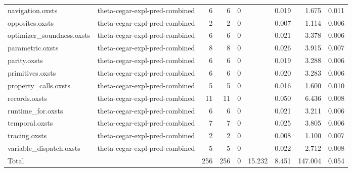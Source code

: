 \begin{tabular}{llrrrrrrr}
navigation.oxsts & theta-cegar-expl-pred-combined & 6 & 6 & 0 &  & 0.019 & 1.675 & 0.011 \\
opposites.oxsts & theta-cegar-expl-pred-combined & 2 & 2 & 0 &  & 0.007 & 1.114 & 0.006 \\
optimizer\_soundness.oxsts & theta-cegar-expl-pred-combined & 6 & 6 & 0 &  & 0.021 & 3.378 & 0.006 \\
parametric.oxsts & theta-cegar-expl-pred-combined & 8 & 8 & 0 &  & 0.026 & 3.915 & 0.007 \\
parity.oxsts & theta-cegar-expl-pred-combined & 6 & 6 & 0 &  & 0.019 & 3.288 & 0.006 \\
primitives.oxsts & theta-cegar-expl-pred-combined & 6 & 6 & 0 &  & 0.020 & 3.283 & 0.006 \\
property\_calls.oxsts & theta-cegar-expl-pred-combined & 5 & 5 & 0 &  & 0.016 & 1.600 & 0.010 \\
records.oxsts & theta-cegar-expl-pred-combined & 11 & 11 & 0 &  & 0.050 & 6.436 & 0.008 \\
runtime\_for.oxsts & theta-cegar-expl-pred-combined & 6 & 6 & 0 &  & 0.021 & 3.211 & 0.006 \\
temporal.oxsts & theta-cegar-expl-pred-combined & 7 & 7 & 0 &  & 0.025 & 3.805 & 0.006 \\
tracing.oxsts & theta-cegar-expl-pred-combined & 2 & 2 & 0 &  & 0.008 & 1.100 & 0.007 \\
variable\_dispatch.oxsts & theta-cegar-expl-pred-combined & 5 & 5 & 0 &  & 0.022 & 2.712 & 0.008 \\
\midrule
Total &  & 256 & 256 & 0 & 15.232 & 8.451 & 147.004 & 0.054 \\
\bottomrule
\end{tabular}
